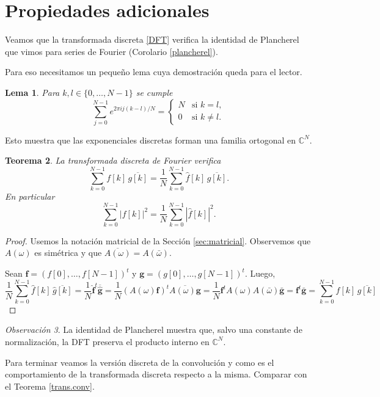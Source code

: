 \documentclass[12pt, a4paper]{amsbook}
\newcommand{\C}{{\mathbb C}}
\newcommand{\ff}{{\mathbf f}}
\newcommand{\gb}{{\mathbf g}}
\newtheorem{teo}{Teorema}[section]
\newtheorem{lema}[teo]{Lema}
\theoremstyle{remark}
\newtheorem{obs}[teo]{Observación}
\theoremstyle{definition}
\numberwithin{section}{chapter}
\numberwithin{subsection}{section}
\numberwithin{equation}{section}
\numberwithin{figure}{chapter}
\begin{document}
\section{Propiedades adicionales}

Veamos que la transformada discreta \eqref{DFT} verifica la identidad de Plancherel que vimos para series de Fourier (Corolario \ref{plancherel}).

Para eso necesitamos un pequeño lema cuya demostración queda para el lector.
\begin{lema}
Para $k,l\in\{0,\dots,N-1\}$ se cumple
$$
\sum_{j=0}^{N-1} e^{2\pi i j(k-l)/N} = 
\begin{cases}
N & \text{si } k=l,\\
0 & \text{si } k\neq l.
\end{cases}
$$
\end{lema}
Esto muestra que las exponenciales discretas forman una familia ortogonal en $\C^N$.

\begin{teo}
La transformada discreta de Fourier verifica
$$
\sum_{k=0}^{N-1} f[k]\, \overline{g[k]} = \frac{1}{N}\sum_{k=0}^{N-1} \hat f[k]\, \overline{\hat g[k]}.
$$
En particular
$$
\sum_{k=0}^{N-1} |f[k]|^2 = \frac{1}{N}\sum_{k=0}^{N-1} |\hat f[k]|^2.
$$
\end{teo}

\begin{proof}
Usemos la notación matricial de la Sección \ref{sec:matricial}. Observemos que $A(\omega)$ es simétrica y que $\overline{A(\omega)} = A(\bar \omega)$. 

Sean $\ff = (f[0],\dots, f[N-1])^t$ y $\gb = (g[0],\dots,g[N-1])^t$. Luego,
$$
\frac{1}{N}\sum_{k=0}^{N-1} \hat f[k]\, \overline{\hat g[k]} = \frac{1}{N}\hat \ff^t \overline{\hat \gb} = \frac{1}{N} (A(\omega)\ff)^t \overline{A(\omega)\gb} = \frac{1}{N} \ff^t A(\omega)A(\bar\omega)\bar\gb = \ff^t\bar\gb =\sum_{k=0}^{N-1} f[k]\, \overline{g[k]} 
$$
\end{proof}

\begin{obs}
La identidad de Plancherel muestra que, salvo una constante de normalización, la DFT preserva el producto interno en $\C^N$.
\end{obs}
Para terminar veamos la versión discreta de la convolución y como es el comportamiento de la transformada discreta respecto a la misma. Comparar con el Teorema \ref{trans.conv}.
\end{document}
